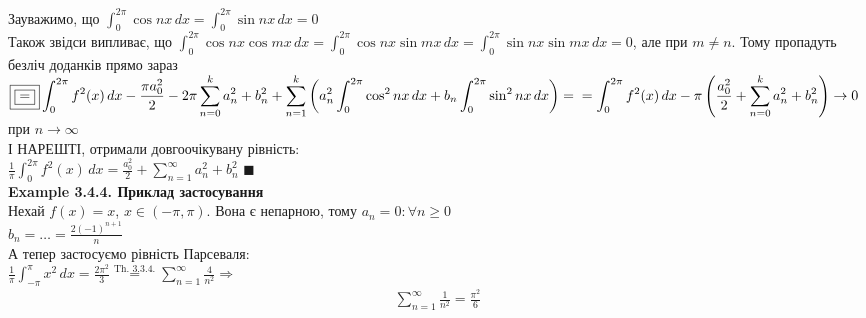 \documentclass[a4paper, 10pt]{article}
\def\hugespace{\vspace{5mm} \\}
\theoremstyle{theoremdd}
\theoremstyle{theoremdd}
\theoremstyle{theoremdd}
\theoremstyle{theoremdd}
\theoremstyle{theoremdd}
\theoremstyle{theoremdd}
\theoremstyle{theoremdd}
\theoremstyle{theoremdd}
\begin{document}
Зауважимо, що $\displaystyle \int_0^{2\pi} \cos nx \,dx = \int_0^{2\pi} \sin nx \,dx = 0$\\
Також звідси випливає, що $\displaystyle \int_0^{2\pi} \cos nx \cos mx \,dx = \int_0^{2\pi} \cos nx \sin mx \,dx = \int_0^{2\pi} \sin nx \sin mx \,dx = 0$, але при $m \neq n$. Тому пропадуть безліч доданків прямо зараз\\
$\displaystyle \boxed{\boxed{=}} \int_0^{2\pi} f^2(x)\,dx -\frac{\pi a_0^2}{2} - 2\pi \sum_{n=0}^k a_n^2 + b_n^2 + \sum_{n=1}^k \left(a_n^2 \int_0^{2\pi} \cos^2 nx \,dx + b_n \int_0^{2\pi} \sin^2 nx \,dx  \right) = \\
= \int_0^{2\pi} f^2(x)\,dx - \pi \left(\frac{a^2_0}{2} + \sum_{n=0}^k a_n^2 + b_n^2 \right) \to 0$ при $n \to \infty$\\
І НАРЕШТІ, отримали довгоочікувану рівність:\\
$\displaystyle \frac{1}{\pi} \int_{0}^{2\pi} f^2(x)\,dx = \frac{a_0^2}{2} + \sum_{n=1}^{\infty} a_n^2 + b_n^2$ $\blacksquare$
\hugespace
\textbf{Example 3.4.4. Приклад застосування}\\
Нехай $f(x) = x$, $x \in (-\pi, \pi)$. Вона є непарною, тому $a_n = 0: \forall n \geq 0$\\
$\displaystyle b_n = \dots = \frac{2(-1)^{n+1}}{n}$\\
А тепер застосуємо рівність Парсеваля:\\
$\displaystyle \frac{1}{\pi} \int_{-\pi}^{\pi} x^2\,dx = \frac{2\pi^2}{3} \overset{\textrm{Th. 3.3.4.}}{=} \sum_{n=1}^{\infty} \frac{4}{n^2} \Rightarrow$
\begin{align*}
\sum_{n=1}^{\infty} \frac{1}{n^2} = \frac{\pi^2}{6}
\end{align*}
\hugespace
\end{document}
